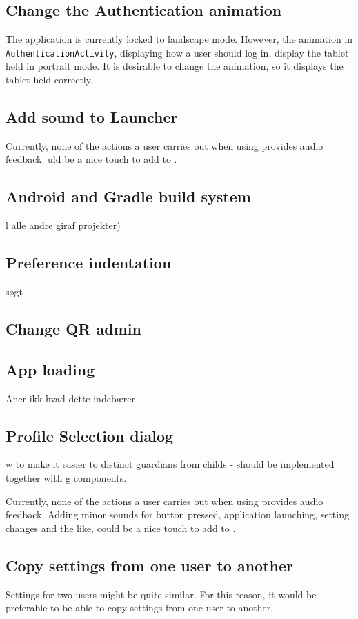 {\subsection{Change the Authentication animation}
The application is currently locked to landscape mode.
However, the animation in \lstinline!AuthenticationActivity!, displaying how a user should log in, display the tablet held in portrait mode.
It is desirable to change the animation, so it displays the tablet held correctly.

\subsection{Add sound to Launcher}
Currently, none of the actions a user carries out when using \launcher provides audio feedback.
uld be a nice touch to add to \launcher. 

\subsection{Android and Gradle build system}
l alle andre giraf projekter)

\subsection{Preference indentation}
søgt

\subsection{Change QR admin}

\subsection{App loading}

Aner ikk hvad dette indebærer

\subsection{Profile Selection dialog}
w to make it easier to distinct guardians from childs - should be implemented together with g components.

Currently, none of the actions a user carries out when using \launcher provides audio feedback.
Adding minor sounds for button pressed, application launching, setting changes and the like, could be a nice touch to add to \launcher. 

\subsection{Copy settings from one user to another}
Settings for two users might be quite similar.
For this reason, it would be preferable to be able to copy settings from one user to another.                                                                                   
                                                                                   
}

